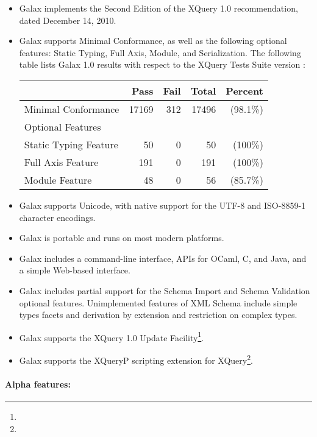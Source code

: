 \begin{itemize}
\item Galax implements the Second Edition of the XQuery 1.0
  recommendation, dated December 14, 2010.
\item Galax supports Minimal Conformance, as well as the following
  optional features: Static Typing, Full Axis, Module, and
  Serialization. The following table lists Galax 1.0 results with
  respect to the XQuery Tests Suite version \xquerytestsuiteversion:
\begin{center}
\begin{tabular}{|lrrrr|}
  \hline
  & Pass & Fail & Total & Percent\\\hline
  Minimal Conformance      &       17169 & 312 & 17496 & (98.1\%)\\\hline
  Optional Features &&&& \\
  \hspace*{0.5cm}Static Typing Feature   &      50   & 0   & 50 & (100\%)\\
  \hspace*{0.5cm}Full Axis Feature        &     191  & 0   & 191 & (100\%)\\
  \hspace*{0.5cm}Module Feature            &    48    & 0   & 56 & (85.7\%)\\\hline
\end{tabular}

\end{center}
\item Galax supports Unicode, with native support for the UTF-8 and
  ISO-8859-1 character encodings.
\item Galax is portable and runs on most modern platforms.
\item Galax includes a command-line interface, APIs for OCaml, C, and
  Java, and a simple Web-based interface.
\item Galax includes partial support for the Schema Import and Schema
  Validation optional features. Unimplemented features of XML Schema
  include simple types facets and derivation by extension and
  restriction on complex types.
\item Galax supports the XQuery 1.0 Update
Facility\footnote{\ultfurl}.
\item Galax supports the XQueryP scripting extension for
  XQuery\footnote{\xqueryp}.
\end{itemize}

\paragraph{Alpha features:}

